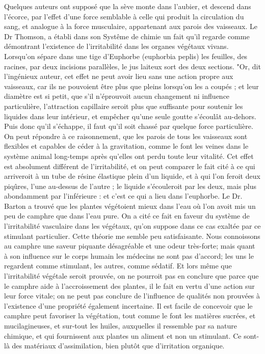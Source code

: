 Quelques auteurs ont supposé que la sève monte dans l'aubier, et descend dans l'écorce, par l'effet d'une force semblable à celle qui produit la circulation du sang, et analogue à la force musculaire, appartenant aux parois des vaisseaux.
Le Dr Thomson, a établi dans son Systême de chimie un fait qu'il regarde comme démontrant l'existence de l'irritabilité dans les organes végétaux vivans. Lorsqu'on sépare dans une tige d'Euphorbe (euphorbia peplis) les feuilles, des racines, par deux incisions parallèles, le jus laiteux sort des deux sections. "Or, dit l'ingénieux auteur, cet effet ne peut avoir lieu sans une action propre aux vaisseaux, car ils ne pouvoient être plus que\setcounter{page}{98} pleins lorsqu'on les a coupés ; et leur diamètre est si petit, que s'il n'éprouvoit aucun changement ni influence particulière, l'attraction capillaire seroit plus que suffisante pour soutenir les liquides dans leur intérieur, et empêcher qu'une seule goutte s'écoulât au-dehors. Puis donc qu'il s'échappe, il faut qu'il soit chassé par quelque force particulière.
On peut répondre à ce raisonnement, que les parois de tous les vaisseaux sont flexibles et capables de céder à la gravitation, comme le font les veines dans le système animal long-temps après qu'elles ont perdu toute leur vitalité. Cet effet est absolument différent de l'irritabilité, et on peut comparer le fait cité à ce qui arriveroit à un tube de résine élastique plein d'un liquide, et à qui l'on feroit deux piqûres, l'une au-dessus de l'autre ; le liquide s'écouleroit par les deux, mais plus abondamment par l'inférieure : et c'est ce qui a lieu dans l'euphorbe.
Le Dr. Barton a trouvé que les plantes végétoient mieux dans l'eau où l'on avoit mis un peu de camphre que dans l'eau pure. On a cité ce fait en faveur du système de l'irritabilité vasculaire dans les végétaux, qu'on suppose dans ce cas exaltée par ce stimulant particulier. Cette théorie me semble peu satisfaisante. Nous connoissons au\setcounter{page}{99} camphre une saveur piquante désagréable et une odeur très-forte; mais quant à son influence sur le corps humain les médecins ne sont pas d'accord; les uns le regardent comme stimulant, les autres, comme sédatif. Et lors même que l'irritabilité végétale seroit prouvée, on ne pourroit pas en conclure que parce que le camphre aide à l'accroissement des plantes, il le fait en vertu d'une action sur leur force vitale; on ne peut pas conclure de l'influence de qualités non prouvées à l'existence d'une propriété également incertaine.
Il est facile de concevoir que le camphre peut favoriser la végétation, tout comme le font les matières sucrées, et mucilagineuses, et sur-tout les huiles, auxquelles il ressemble par sa nature chimique, et qui fournissent aux plantes un aliment et non un stimulant. Ce sont-là des matériaux d'assimilation, bien plutôt que d'irritation organique.
